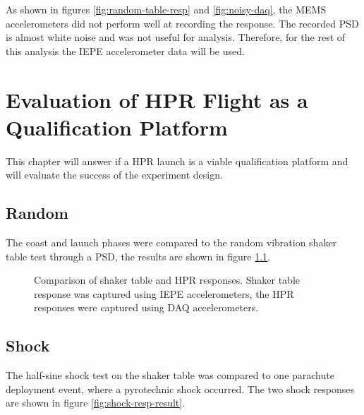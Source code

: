 \documentclass{report}
\begin{document}
As shown in figures \ref{fig:random-table-resp} and \ref{fig:noisy-daq}, the MEMS accelerometers did not perform well at recording the response. The recorded PSD is almost white noise and was not useful for analysis. Therefore, for the rest of this analysis the IEPE accelerometer data will be used.

\chapter{Evaluation of HPR Flight as a Qualification Platform}

This chapter will answer if a HPR launch is a viable qualification platform and will evaluate the success of the experiment design.


\section{Random}

The coast and launch phases were compared to the random vibration shaker table test through a PSD, the results are shown in figure \ref{fig:random-psd-result}.

\begin{figure}[H]
  \centering
  
  \caption{Comparison of shaker table and HPR responses. Shaker table response was captured using IEPE accelerometers, the HPR responses were captured using DAQ accelerometers.}
  \label{fig:random-psd-result}
\end{figure}

\section{Shock}

The half-sine shock test on the shaker table was compared to one parachute deployment event, where a pyrotechnic shock occurred. The two shock responses are shown in figure \ref{fig:shock-resp-result}.
\end{document}
